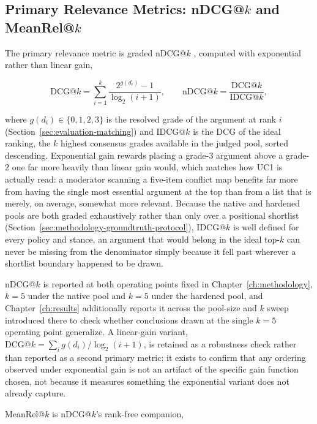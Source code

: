 \subsection{Primary Relevance Metrics: nDCG@$k$ and MeanRel@$k$}
\label{sec:evaluation-uc1-relevance}

The primary relevance metric is graded nDCG@$k$ \cite{jarvelin2002ndcg}, computed with exponential
rather than linear gain,

\begin{equation}
\mathrm{DCG}@k = \sum_{i=1}^{k} \frac{2^{g(d_i)} - 1}{\log_2(i+1)}, \qquad
\mathrm{nDCG}@k = \frac{\mathrm{DCG}@k}{\mathrm{IDCG}@k},
\label{eq:evaluation-ndcg}
\end{equation}

\noindent where $g(d_i) \in \{0,1,2,3\}$ is the resolved grade of the argument at rank $i$
(Section~\ref{sec:evaluation-matching}) and $\mathrm{IDCG}@k$ is the DCG of the ideal ranking, the
$k$ highest consensus grades available in the judged pool, sorted descending. Exponential gain
rewards placing a grade-3 argument above a grade-2 one far more heavily than linear gain would,
which matches how UC1 is actually read: a moderator scanning a five-item conflict map benefits far
more from having the single most essential argument at the top than from a list that is merely,
on average, somewhat more relevant. Because the native and hardened pools are both graded
exhaustively rather than only over a positional shortlist
(Section~\ref{sec:methodology-groundtruth-protocol}), $\mathrm{IDCG}@k$ is well defined for every
policy and stance, an argument that would belong in the ideal top-$k$ can never be missing from the
denominator simply because it fell past wherever a shortlist boundary happened to be drawn.

nDCG@$k$ is reported at both operating points fixed in Chapter~\ref{ch:methodology}, $k=5$ under
the native pool and $k=5$ under the hardened pool, and Chapter~\ref{ch:results} additionally
reports it across the pool-size and $k$ sweep introduced there to check whether conclusions drawn
at the single $k=5$ operating point generalize. A linear-gain variant, $\mathrm{DCG}@k = \sum_i
g(d_i) / \log_2(i+1)$, is retained as a robustness check rather than reported as a second primary
metric: it exists to confirm that any ordering observed under exponential gain is not an artifact
of the specific gain function chosen, not because it measures something the exponential variant
does not already capture.

MeanRel@$k$ is nDCG@$k$'s rank-free companion,

